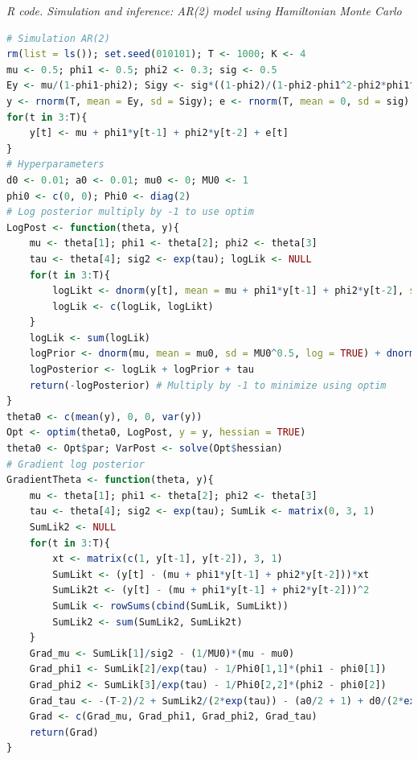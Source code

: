 \begin{tcolorbox}[enhanced,width=4.67in,center upper,
	fontupper=\large\bfseries,drop shadow southwest,sharp corners]
	\textit{R code. Simulation and inference: AR(2) model using Hamiltonian Monte Carlo}
	\begin{VF}
		\begin{lstlisting}[language=R]
# Simulation AR(2)
rm(list = ls()); set.seed(010101); T <- 1000; K <- 4 
mu <- 0.5; phi1 <- 0.5; phi2 <- 0.3; sig <- 0.5 
Ey <- mu/(1-phi1-phi2); Sigy <- sig*((1-phi2)/(1-phi2-phi1^2-phi2*phi1^2-phi2^2+phi2^3))^0.5 
y <- rnorm(T, mean = Ey, sd = Sigy); e <- rnorm(T, mean = 0, sd = sig)
for(t in 3:T){
	y[t] <- mu + phi1*y[t-1] + phi2*y[t-2] + e[t]
}
# Hyperparameters
d0 <- 0.01; a0 <- 0.01; mu0 <- 0; MU0 <- 1
phi0 <- c(0, 0); Phi0 <- diag(2)
# Log posterior multiply by -1 to use optim
LogPost <- function(theta, y){
	mu <- theta[1]; phi1 <- theta[2]; phi2 <- theta[3]
	tau <- theta[4]; sig2 <- exp(tau); logLik <- NULL
	for(t in 3:T){
		logLikt <- dnorm(y[t], mean = mu + phi1*y[t-1] + phi2*y[t-2], sd = sig2^0.5, log = TRUE)
		logLik <- c(logLik, logLikt)
	}
	logLik <- sum(logLik)
	logPrior <- dnorm(mu, mean = mu0, sd = MU0^0.5, log = TRUE) + dnorm(phi1, mean = phi0[1], sd = Phi0[1,1]^0.5, log = TRUE) + dnorm(phi2, mean = phi0[2], sd = Phi0[2,2]^0.5, log = TRUE) + invgamma::dinvgamma(sig2, shape = a0/2, rate = d0/2, log = TRUE)
	logPosterior <- logLik + logPrior + tau
	return(-logPosterior) # Multiply by -1 to minimize using optim
}
theta0 <- c(mean(y), 0, 0, var(y))
Opt <- optim(theta0, LogPost, y = y, hessian = TRUE)
theta0 <- Opt$par; VarPost <- solve(Opt$hessian)
# Gradient log posterior
GradientTheta <- function(theta, y){
	mu <- theta[1]; phi1 <- theta[2]; phi2 <- theta[3]
	tau <- theta[4]; sig2 <- exp(tau); SumLik <- matrix(0, 3, 1)
	SumLik2 <- NULL
	for(t in 3:T){
		xt <- matrix(c(1, y[t-1], y[t-2]), 3, 1)
		SumLikt <- (y[t] - (mu + phi1*y[t-1] + phi2*y[t-2]))*xt
		SumLik2t <- (y[t] - (mu + phi1*y[t-1] + phi2*y[t-2]))^2
		SumLik <- rowSums(cbind(SumLik, SumLikt))
		SumLik2 <- sum(SumLik2, SumLik2t)
	}
	Grad_mu <- SumLik[1]/sig2 - (1/MU0)*(mu - mu0)
	Grad_phi1 <- SumLik[2]/exp(tau) - 1/Phi0[1,1]*(phi1 - phi0[1])
	Grad_phi2 <- SumLik[3]/exp(tau) - 1/Phi0[2,2]*(phi2 - phi0[2])
	Grad_tau <- -(T-2)/2 + SumLik2/(2*exp(tau)) - (a0/2 + 1) + d0/(2*exp(tau)) + 1 
	Grad <- c(Grad_mu, Grad_phi1, Grad_phi2, Grad_tau)
	return(Grad)
}
\end{lstlisting}
	\end{VF}
\end{tcolorbox}

